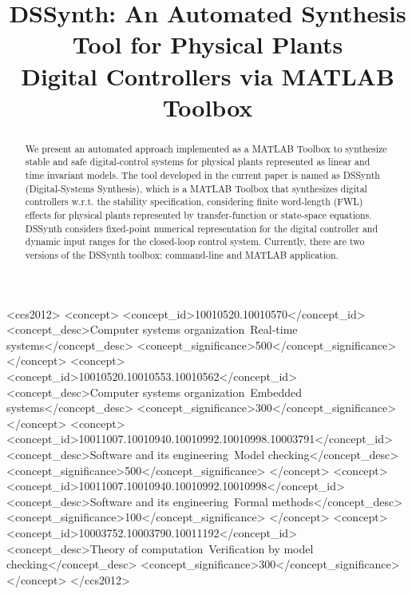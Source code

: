 \documentclass[sigconf]{acmart}
\begin{document}
\title{DSSynth: An Automated Synthesis Tool for Physical Plants \\ Digital Controllers via MATLAB Toolbox}

\begin{abstract}
We present an automated approach implemented as a MATLAB Toolbox to synthesize stable and safe digital-control systems for physical plants represented as linear and time invariant models. The tool developed in the current paper is named as DSSynth (Digital-Systems Synthesis), which is a MATLAB Toolbox that synthesizes digital controllers w.r.t. the stability specification, considering finite word-length (FWL) effects for physical plants represented by transfer-function or state-space equations. DSSynth considers fixed-point numerical representation for the digital controller and dynamic input ranges for the closed-loop control system. Currently, there are two versions of the DSSynth toolbox: command-line and MATLAB application.
\end{abstract}

%
%
\begin{CCSXML}
<ccs2012>
<concept>
<concept_id>10010520.10010570</concept_id>
<concept_desc>Computer systems organization~Real-time systems</concept_desc>
<concept_significance>500</concept_significance>
</concept>
<concept>
<concept_id>10010520.10010553.10010562</concept_id>
<concept_desc>Computer systems organization~Embedded systems</concept_desc>
<concept_significance>300</concept_significance>
</concept>
<concept>
<concept_id>10011007.10010940.10010992.10010998.10003791</concept_id>
<concept_desc>Software and its engineering~Model checking</concept_desc>
<concept_significance>500</concept_significance>
</concept>
<concept>
<concept_id>10011007.10010940.10010992.10010998</concept_id>
<concept_desc>Software and its engineering~Formal methods</concept_desc>
<concept_significance>100</concept_significance>
</concept>
<concept>
<concept_id>10003752.10003790.10011192</concept_id>
<concept_desc>Theory of computation~Verification by model checking</concept_desc>
<concept_significance>300</concept_significance>
</concept>
</ccs2012>
\end{CCSXML}

\end{document}
